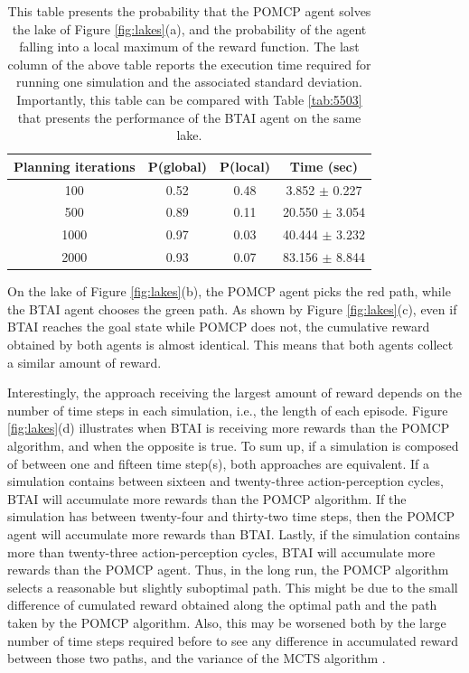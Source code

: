 \documentclass[twoside,11pt]{article}
\begin{document}
\begin{table}[H]
\centering
\begin{tabular}{ |c|c|c|c| }
 \hline
 Planning iterations & P(global) & P(local) & Time (sec) \\
 \hline
 100 & 0.52 & 0.48 & 3.852 $\pm$ 0.227 \\
 \hline
 500 & 0.89 & 0.11 & 20.550 $\pm$ 3.054 \\
 \hline
 1000 & 0.97 & 0.03 & 40.444 $\pm$ 3.232 \\
 \hline
 2000 & 0.93 & 0.07 & 83.156 $\pm$ 8.844 \\
  \hline
\end{tabular}
\caption{This table presents the probability that the POMCP agent solves the lake of Figure \ref{fig:lakes}(a), and the probability of the agent falling into a local maximum of the reward function. The last column of the above table reports the execution time required for running one simulation and the associated standard deviation. Importantly, this table can be compared with Table \ref{tab:5503} that presents the performance of the BTAI agent on the same lake.}
\label{tab:5505}
\end{table}

On the lake of Figure \ref{fig:lakes}(b), the POMCP agent picks the red path, while the BTAI agent chooses the green path. As shown by Figure \ref{fig:lakes}(c), even if BTAI reaches the goal state while POMCP does not, the cumulative reward obtained by both agents is almost identical. This means that both agents collect a similar amount of reward.

Interestingly, the approach receiving the largest amount of reward depends on the number of time steps in each simulation, i.e., the length of each episode. Figure \ref{fig:lakes}(d) illustrates when BTAI is receiving more rewards than the POMCP algorithm, and when the opposite is true. To sum up, if a simulation is composed of between one and fifteen time step(s), both approaches are equivalent. If a simulation contains between sixteen and twenty-three action-perception cycles, BTAI will accumulate more rewards than the POMCP algorithm. If the simulation has between twenty-four and thirty-two time steps, then the POMCP agent will accumulate more rewards than BTAI. Lastly, if the simulation contains more than twenty-three action-perception cycles, BTAI will accumulate more rewards than the POMCP agent. Thus, in the long run, the POMCP algorithm selects a reasonable but slightly suboptimal path. This might be due to the small difference of cumulated reward obtained along the optimal path and the path taken by the POMCP algorithm. Also, this may be worsened both by the large number of time steps required before to see any difference in accumulated reward between those two paths, and the variance of the MCTS algorithm \citep{veness2011variance}.
\end{document}
